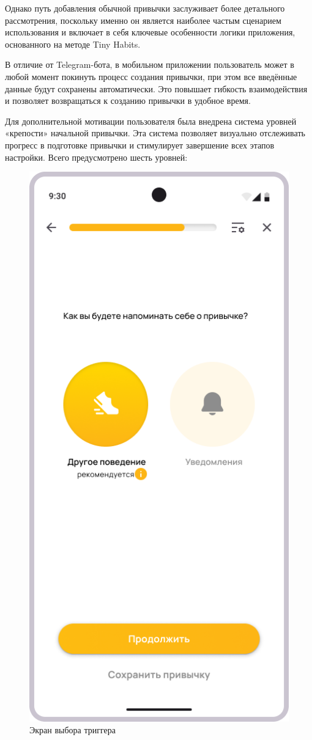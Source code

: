 \documentclass[pdflatex,sn-mathphys-num]{sn-jnl}%
\theoremstyle{thmstyleone}%
\theoremstyle{thmstyletwo}%
\theoremstyle{thmstylethree}%
\begin{document}
Однако путь добавления обычной привычки заслуживает более детального рассмотрения, поскольку именно он является наиболее частым сценарием использования и включает в себя ключевые особенности логики приложения, основанного на методе Tiny Habits.

В отличие от Telegram-бота, в мобильном приложении пользователь может в любой момент покинуть процесс создания привычки, при этом все введённые данные будут сохранены автоматически. Это повышает гибкость взаимодействия и позволяет возвращаться к созданию привычки в удобное время.

Для дополнительной мотивации пользователя была внедрена система уровней «крепости» начальной привычки. Эта система позволяет визуально отслеживать прогресс в подготовке привычки и стимулирует завершение всех этапов настройки. Всего предусмотрено шесть уровней:

\begin{figure}
    \centering
    \includegraphics[width=0.5\linewidth]{figures/App/Habits_add_4_1.png}
    \caption{Экран выбора триггера}
    \label{fig:Habits_add_4_1}
\end{figure}
\end{document}
